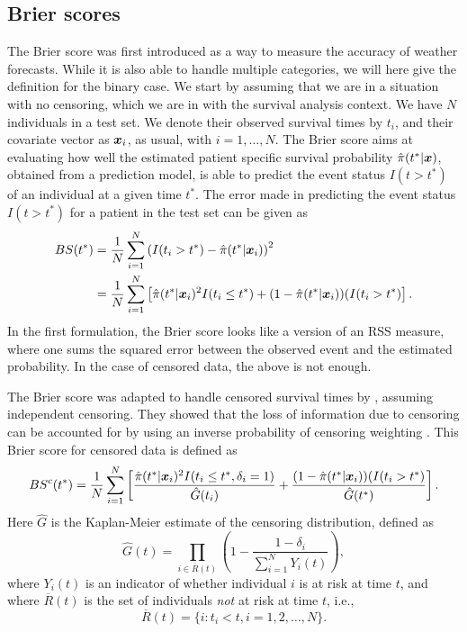 \subsection{Brier scores}
The Brier score \citep{brier1950} was first introduced as a way to measure the accuracy of weather forecasts. While it is also able to handle multiple categories, we will here give the definition for the binary case.
We start by assuming that we are in a situation with no censoring, which we are in with the survival analysis context.
We have $N$ individuals in a test set.
We denote their observed survival times by $t_i$, and their covariate vector as $\bm{x}_i$, as usual, with $i=1,\ldots,N$. The Brier score aims at evaluating how well the estimated patient specific survival probability $\hat{\pi}(t^*|\bm{x})$, obtained from a prediction model, is able to predict the event status $I(t>t^*)$ of an individual at a given time $t^*$.
The error made in predicting the event status $I(t>t^*)$ for a patient in the test set can be given as
\begin{align*}
BS(t^*)&=\frac{1}{N}\sum_{i=1}^N\left(I(t_i>t^*)-\hat{\pi}(t^*|\bm{x}_i)\right)^2 \\
    &=\frac{1}{N}\sum_{i=1}^N\left[\hat{\pi}(t^*|\bm{x}_i)^2I(t_i\leq t^*)+(1-\hat{\pi}(t^*|\bm{x}_i))(I(t_i>t^*)\right].
\end{align*}
In the first formulation, the Brier score looks like a version of an RSS measure, where one sums the squared error between the observed event and the estimated probability.
In the case of censored data, the above is not enough.

The Brier score was adapted to handle censored survival times by \citet{graf}, assuming independent censoring.
They showed that the loss of information due to censoring can be accounted for by using an inverse probability of censoring weighting \citep{bovelstadborgan}.
This Brier score for censored data is defined as
\begin{equation*}
    BS^c(t^*)=\frac{1}{N}\sum_{i=1}^N\left[\frac{\hat{\pi}(t^*|\bm{x}_i)^2I(t_i\leq t^*,\delta_i=1)}{\hat{G}(t_i)}+\frac{(1-\hat{\pi}(t^*|\bm{x}_i))(I(t_i>t^*)}{\hat{G}(t^*)}\right].
\end{equation*}
Here $\hat{G}$ is the Kaplan-Meier estimate of the censoring distribution, defined as
\begin{equation*}
    \hat{G}(t)=\prod_{i\in \overline{R}(t)}\left(1-\frac{1-\delta_i}{\sum_{i=1}^NY_i(t)}\right),
\end{equation*}
where $Y_i(t)$ is an indicator of whether individual $i$ is at risk at time $t$, and where $\overline{R}(t)$ is the set of individuals \textit{not} at risk at time $t$, i.e.,
\begin{equation*}
    \overline{R}(t)=\{i\colon t_i<t,i=1,2,\ldots,N\}.
\end{equation*}

